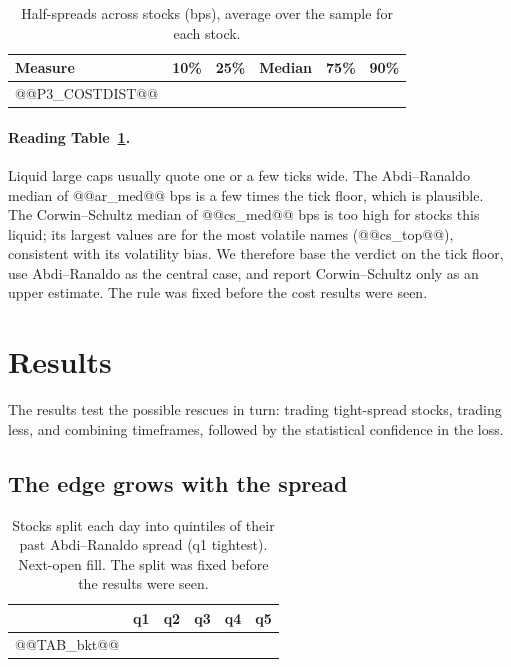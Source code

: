\documentclass[11pt,a4paper]{article}
\begin{document}
\begin{table}[htbp]
\centering
\caption{Half-spreads across stocks (bps), average over the sample for each stock.}
\label{tab:costdist}
\small
\begin{tabular}{@{}lrrrrr@{}}
\toprule
Measure & 10\% & 25\% & Median & 75\% & 90\% \\
\midrule
@@P3_COSTDIST@@
\bottomrule
\end{tabular}
\end{table}

\paragraph{Reading Table~\ref{tab:costdist}.} Liquid large caps usually quote one or a few ticks wide.
The Abdi--Ranaldo median of @@ar_med@@ bps is a few times the tick floor, which is plausible. The
Corwin--Schultz median of @@cs_med@@ bps is too high for stocks this liquid; its largest values are for the
most volatile names (@@cs_top@@), consistent with its volatility bias. We therefore base the verdict on
the tick floor, use Abdi--Ranaldo as the central case, and report Corwin--Schultz only as an upper estimate. The rule was fixed before the cost results were seen.

\section{Results}
\label{sec:results}

The results test the possible rescues in turn: trading tight-spread stocks, trading less, and combining timeframes, followed by the statistical confidence in the loss.


\subsection{The edge grows with the spread}

\begin{table}[htbp]
\centering
\caption{Stocks split each day into quintiles of their past Abdi--Ranaldo spread (q1 tightest).
Next-open fill. The split was fixed before the results were seen.}
\label{tab:bkt}
\small
\begin{tabular}{@{}lrrrrr@{}}
\toprule
& q1 & q2 & q3 & q4 & q5 \\
\midrule
@@TAB_bkt@@
\bottomrule
\end{tabular}
\end{table}
\end{document}
